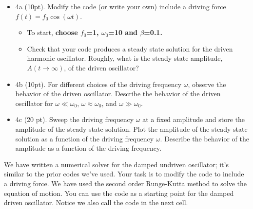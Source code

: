 \documentclass[11pt]{article}
\providecommand{\tightlist}{%
      \setlength{\itemsep}{0pt}\setlength{\parskip}{0pt}}
\begin{document}
\begin{itemize}
\tightlist
\item
  4a (10pt). Modify the code (or write your own) include a driving force
  \(f(t) = f_0\cos(\omega t)\).

  \begin{itemize}
  \tightlist
  \item
    To start, \textbf{choose \(f_0\)=1, \(\omega_0\)=10 and
    \(\beta\)=0.1.}
  \item
    Check that your code produces a steady state solution for the driven
    harmonic oscillator. Roughly, what is the steady state amplitude,
    \(A(t \rightarrow \infty)\), of the driven oscillator?
  \end{itemize}
\item
  4b (10pt). For different choices of the driving frequency \(\omega\),
  observe the behavior of the driven oscillator. Describe the behavior
  of the driven oscillator for \(\omega \ll \omega_0\),
  \(\omega \approx \omega_0\), and \(\omega \gg \omega_0\).
\item
  4c (20 pt). Sweep the driving frequency \(\omega\) at a fixed
  amplitude and store the amplitude of the steady-state solution. Plot
  the amplitude of the steady-state solution as a function of the
  driving frequency \(\omega\). Describe the behavior of the amplitude
  as a function of the driving frequency.
\end{itemize}

We have written a numerical solver for the damped undriven oscillator;
it's similar to the prior codes we've used. Your task is to modify the
code to include a driving force. We have used the second order
Runge-Kutta method to solve the equation of motion. You can use the code
as a starting point for the damped driven oscillator. Notice we also
call the code in the next cell.
\end{document}
